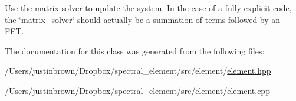  Use the matrix solver to update the system. In the case of a fully explicit code, the \char`\"{}matrix\-\_\-solver\char`\"{} should actually be a summation of terms followed by an F\-F\-T. 

The documentation for this class was generated from the following files\-:\begin{DoxyCompactItemize}
\item 
/\-Users/justinbrown/\-Dropbox/spectral\-\_\-element/src/element/\hyperlink{element_8hpp}{element.\-hpp}\item 
/\-Users/justinbrown/\-Dropbox/spectral\-\_\-element/src/element/\hyperlink{element_8cpp}{element.\-cpp}\end{DoxyCompactItemize}
